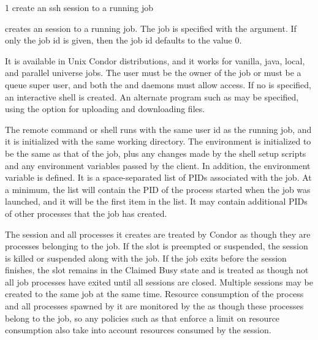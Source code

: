 \begin{ManPage}
{\label{man-condor-ssh-to-job}}{1}
{create an ssh session to a running job}
\Synopsis {}

\ToolDebugOption
{}


\Description

 creates an  session to a running job.
The job is specified with the argument.
If only the job  id is given,
then the job  id defaults to the value 0.

It is available in Unix Condor distributions, 
and it works for vanilla, java, local, and parallel universe jobs.
The user must be the owner of the job or must be a queue super user, 
and both the  and  daemons
must allow  access.
If no  is specified, an interactive shell is created.
An alternate  program such as  may be specified,
using the  option for uploading and downloading files.

The remote command or shell runs with the same user id as the running job,
and it is initialized with the same working directory.
The environment is initialized to be the same as that of the job,
plus any changes made by the shell setup scripts
and any environment variables passed by the  client.
In addition, the environment variable
 is defined.  
It is a space-separated list of PIDs associated with the job.
At a minimum, the list will contain the
PID of the process started when the job was launched,
and it will be the first item in the list.
It may contain additional PIDs of other processes that the job has created.

The  session and all processes it creates are treated by Condor as
though they are processes belonging to the job.
If the slot is preempted or suspended,
the  session is killed or suspended along with the job.
If the job exits before the  session finishes,
the slot remains in the Claimed Busy state and is treated as though not
all job processes have exited until all  sessions are closed.
Multiple  sessions may be created to the same job at the
same time.  Resource consumption of the  process and all processes
spawned by it are monitored by the  as though these
processes belong to the job, so any policies such as  that
enforce a limit on resource consumption also take into account resources
consumed by the  session.


\end{ManPage}
